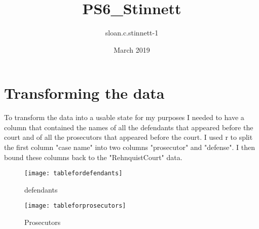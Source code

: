 \documentclass{article}
\title{PS6\_Stinnett}
\author{sloan.c.stinnett-1 }
\date{March 2019}
\begin{document}
\maketitle

\section{Transforming the data}
To transform the data into a usable state for my purposes I needed to have a column that contained the names of all the defendants that appeared before the court and of all the prosecutors that appeared before the court. I used r to split the first column "case name" into two columns "prosecutor" and "defense". I then bound these columns back to the "RehnquistCourt" data. 

\begin{figure}[h!]
\centering
\texttt{[image: tablefordefendants]}
\caption{defendants}
\label{fig:defendants}
\end{figure}

\begin{figure}[h!]
\centering
\texttt{[image: tableforprosecutors]}
\caption{Prosecutors}
\label{fig:prosecutors}
\end{figure}
\end{document}
